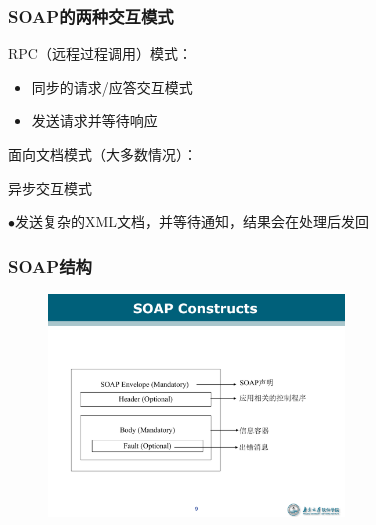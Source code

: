 \subsubsection{SOAP的两种交互模式}
RPC（远程过程调用）模式：
\vspace{-0.3em}
\begin{multicols}{2}
    \begin{itemize}
        \item 同步的请求/应答交互模式
        \item 发送请求并等待响应
    \end{itemize}
\end{multicols}
\vspace{-1em}

面向文档模式（大多数情况）：
\begin{vwcol}[widths={0.3\textwidth,0.65\textwidth},rule=0pt]
    \hspace{1em}{\footnotesize$\bullet$}\hspace{0.5em}异步交互模式

    {\footnotesize$\bullet$}\hspace{0.5em}发送复杂的XML文档，并等待通知，结果会在处理后发回
\end{vwcol}


\subsubsection{SOAP结构}
\begin{figure}[H]
    \vspace{-0.5em}
	\centering
	\includegraphics[width=0.7\textwidth]{images/SOAP结构.pdf}
    \vspace{-1em}
\end{figure}

